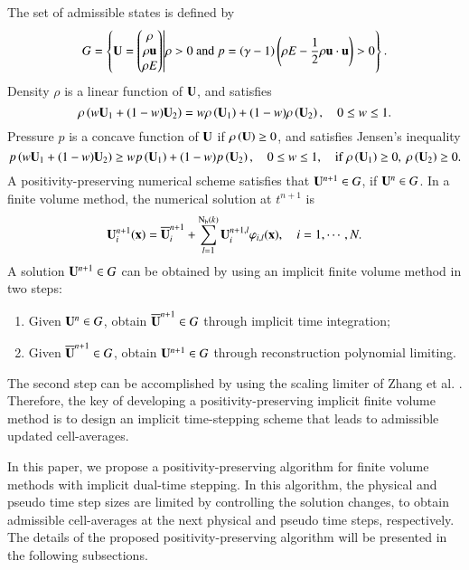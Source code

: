 The set of admissible states is defined by
\begin{equation}
    G= \left\{
    \mathbf{U} =  \begin{pmatrix}
        \rho \\ \rho \mathbf{u} \\ \rho E
    \end{pmatrix} \middle|
    \rho >  0
    \text{ and }
    p=\left(\gamma-1\right) \left(\rho E - \dfrac{1}{2} \rho \mathbf{u} \cdot \mathbf{u}\right) >  0
    \right\}.
\end{equation}
Density $\rho$ is a linear function of $\mathbf{U}$, and satisfies
\begin{equation}
    \label{eq:density-linear}
    \rho\left(w\mathbf{U}_1+(1-w)\mathbf{U}_2\right) = w\rho\left(\mathbf{U}_1\right) + (1-w) \rho \left(\mathbf{U}_2\right) , \quad 0 \leq w \leq 1.
\end{equation}
Pressure $p$ is a concave function of $\mathbf{U}$ if $\rho\left(\mathbf{U}\right) \geq 0$, and satisfies Jensen's inequality
\begin{equation}
    \label{eq:pressure-Jensen}
    p \left(w\mathbf{U}_1+(1-w)\mathbf{U}_2\right)  \geq w p\left(\mathbf{U}_1\right) + (1-w) p \left(\mathbf{U}_2\right), \quad 0 \leq w \leq 1, \quad \mathrm{if} \ \rho\left(\mathbf{U}_1\right) \geq 0, \ \rho\left(\mathbf{U}_2\right) \geq 0.
\end{equation}
A positivity-preserving numerical scheme satisfies that $\mathbf{U}^{n+1} \in G$, if $\mathbf{U}^{n} \in G$.  In a finite volume method, the numerical solution at $t^{n+1}$ is
\begin{equation}
    \mathbf{U}^{n+1}_i (\mathbf{x})= \overline{\mathbf{U}}^{n+1}_i + \sum_{l=1}^{\mathrm{N_b}(k)}{\mathbf{U}_i^{n+1,l} \varphi_{i,l}(\mathbf{x}) }, \quad i=1, \cdots,N.
\end{equation}
A solution $\mathbf{U}^{n+1} \in G$ can be obtained by using an implicit finite volume method in two steps:
\begin{enumerate}[label=(\arabic*)]
    \item Given $\mathbf{U}^n \in G$, obtain $\overline{\mathbf{U}}^{n+1} \in G$ through implicit time integration;
    \item Given $\overline{\mathbf{U}}^{n+1} \in G$, obtain $\mathbf{U}^{n+1} \in G$ through reconstruction polynomial limiting.
\end{enumerate}
The second step can be accomplished by using the scaling limiter of Zhang et al. \cite{zhang2010positivity}. Therefore, the key of developing a positivity-preserving implicit finite volume method is to design an implicit time-stepping scheme that leads to admissible updated cell-averages.

In this paper, we propose a positivity-preserving algorithm for finite volume methods with implicit dual-time stepping. In this algorithm, the physical and pseudo time step sizes are limited by controlling the solution changes, to obtain admissible cell-averages at the next physical and pseudo time steps, respectively. The details of the proposed positivity-preserving algorithm will be presented in the following subsections.

